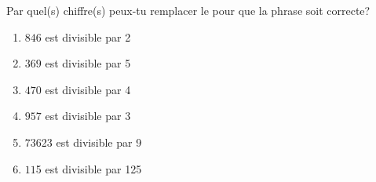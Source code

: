 %
%
	Par quel(s) chiffre(s) peux-tu remplacer le  pour que la phrase soit correcte?
	\begin{enumerate}[cols=3]
		\item \(84\)\(6\) est divisible par 2
		\item \(369\) est divisible par 5
		\item \(47\)\(0\) est divisible par 4
		\item \(95\)\(7\) est divisible par 3
		\item \(73\)623 est divisible par 9
		\item \(11\)5 est divisible par 125
	\end{enumerate}
